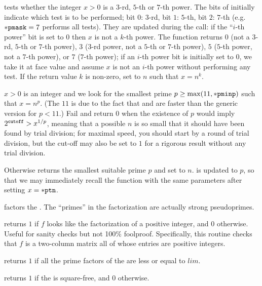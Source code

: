  tests whether the
integer $x > 0$ is a $3$-rd, $5$-th or $7$-th power. The bits of 
initially indicate which test is to be performed;
bit $0$: $3$-rd,
bit $1$: $5$-th,
bit $2$: $7$-th (e.g.~${\tt *pmask} = 7$ performs all tests). They are
updated during the call: if the ``$i$-th power'' bit is set to $0$
then $x$ is not a $k$-th power. The function returns $0$
(not a
$3$-rd,
$5$-th or
$7$-th power),
$3$
($3$-rd power,
not a $5$-th or
$7$-th power),
$5$
($5$-th power,
not a $7$-th power),
or $7$
($7$-th power); if an $i$-th power bit is initially set to $0$, we take it
at face value and assume $x$ is not an $i$-th power without performing any
test. If the return value $k$ is non-zero, set  to $n$ such that $x
= n^k$.

$x > 0$ is an integer and we look for the smallest prime
$p \geq \max(11,{\tt *pminp})$ such that $x = n^p$. (The $11$ is due to the
fact that  and  are faster than
the generic version for $p < 11$.) Fail and return $0$ when the existence
of $p$ would imply $2^{{\tt cutoff}} > x^{1/p}$, meaning that a possible $n$
is so small that it should have been found by trial division; for maximal
speed, you should start by a round of trial division, but the cut-off may
also be set to $1$ for a rigorous result without any trial division.

Otherwise returns the smallest suitable prime $p$ and set  to $n$.
 is updated to $p$, so that we may immediately recall the
function with the same parameters after setting $x = {\tt *ptn}$.


 factors the  . The ``primes''
in the factorization are actually strong pseudoprimes.

 returns $1$ if $f$ looks like the factorization
of a positive integer, and $0$ otherwise. Useful for sanity checks but not
100\% foolproof. Specifically, this routine checks that $f$ is a two-column
matrix all of whose entries are positive integers.

 returns $1$ if all the
prime factors of the   are less or equal to $lim$.

 returns $1$ if the  
is square-free, and $0$ otherwise.


